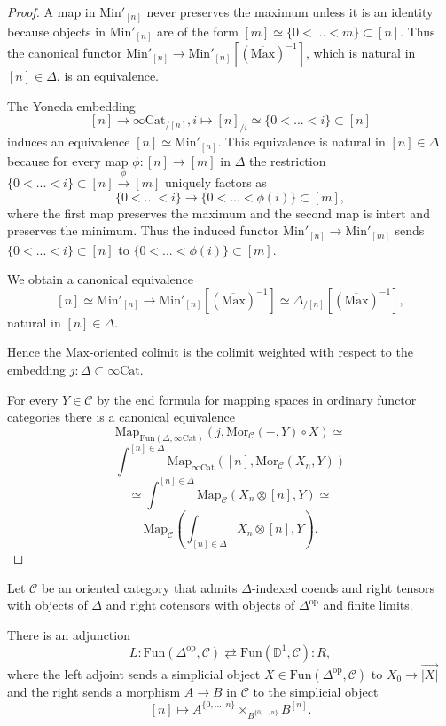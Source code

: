 \documentclass[10pt,oneside]{article}
\numberwithin{equation}{section} %
\numberwithin{figure}{section} %
\theoremstyle{plain}
\theoremstyle{definition}
\newcommand{\bD}{{\mathbb D}}
\newcommand{\mC}{{\mathcal C}}
\newcommand{\bj}{{j}}
\newcommand{\op}{\mathrm{op}}
\newcommand{\Min}{\mathrm{Min}}
\newcommand{\Max}{\mathrm{Max}}
\newcommand{\ot}{\otimes}
\newcommand{\Cat}{\mathrm{Cat}}
\newcommand{\Fun}{\mathrm{Fun}}
\newcommand{\Map}{{\mathrm{Map}}}
\newcommand{\Mor}{{\mathrm{Mor}}}
\begin{document}
\begin{proof}
A map in $\Min'_{[n]}$ never preserves the maximum unless it is an identity because objects in $\Min'_{[n]}$ are of the form 
$[m] \simeq \{0 < ... < m \} \subset [n]$. 
Thus the canonical functor $\Min'_{[n]} \to \Min'_{[n]}[(\overline{\Max})^{-1}]$, which is natural in $[n] \in \Delta$, 
is an equivalence.

The Yoneda embedding $$[n] \to \infty\Cat_{/ [n]}, i \mapsto [n]_{/i} \simeq \{0< ... < i \} \subset [n]$$ induces an equivalence
$[n] \simeq \Min'_{[n]}.$
This equivalence is natural in $[n] \in \Delta$ because
for every map $\phi: [n] \to [m]$ in $\Delta$
the restriction $\{0< ... < i \} \subset [n] \xrightarrow{\phi} [m]$
uniquely factors as $$\{0< ... < i \} \to \{ 0 < ... < \phi(i)\} \subset [m],$$ where the first map preserves the maximum and the second map is intert and preserves the minimum. Thus the induced functor
$\Min'_{[n]} \to \Min'_{[m]}$ sends $\{0< ... < i \} \subset [n]$
to $\{ 0 < ... < \phi(i)\} \subset [m].$

We obtain a canonical equivalence
$$ [n] \simeq \Min'_{[n]} \to \Min'_{[n]}[(\overline{\Max})^{-1}] \simeq \Delta_{/ [n]}[(\overline{\Max})^{-1}],$$ natural in $[n] \in \Delta.$

Hence the $\Max$-oriented colimit is the colimit weighted with respect to the embedding $ \bj: \Delta \subset \infty\Cat.$

For every $Y \in \mC$ by the end formula for mapping spaces in ordinary functor categories \cite[Proposition 5.1.]{articles} there is a canonical equivalence
$$ \Map_{\Fun(\Delta, \infty\Cat)}(\bj, \Mor_{\mC}(-,Y) \circ X) \simeq$$$$ \int^{[n]\in \Delta} \Map_{\infty\Cat}([n], \Mor_{\mC}(X_n,Y)) $$$$ \simeq \int^{[n]\in \Delta} \Map_{\mC}(X_n \ot [n],Y) \simeq $$$$\Map_{\mC}(\int_{[n]\in \Delta} X_n \ot [n],Y). $$
\end{proof}


\begin{corollary}\label{realisorire} Let $\mC$ be an oriented category that admits $\Delta$-indexed coends and right tensors with objects of $\Delta$ and right cotensors with objects of $\Delta^\op$ and finite limits.

There is an adjunction 
\begin{equation}\label{adjori}
L: \Fun(\Delta^\op, \mC) \rightleftarrows \Fun(\bD^1, \mC): R, \end{equation}
where the left adjoint sends a simplicial object 
$X \in \Fun(\Delta^\op, \mC)$ to $ X_0 \to \overset{\to}{| X|} $
and the right sends a morphism $A \to B$ in $\mC$ to the simplicial object
$$ [n] \mapsto A^{\{0,...,n \}} \times_{B^{\{0,...,n \}}} B^{[n]}.$$
    
\end{corollary}
\end{document}

